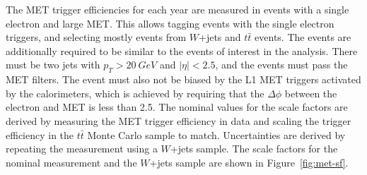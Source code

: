 The MET trigger efficiencies for each year are measured in events with a single electron and large MET.
This allows tagging events with the single electron triggers, and selecting mostly
events from $W$+jets and $t\bar{t}$ events.
The events are additionally required to be similar to the events of interest in the analysis.
There must be two jets with $p_T > \SI{20}{GeV}$ and $|\eta| < 2.5$,
and the events must pass the MET filters.
The event must also not be biased by the L1 MET triggers activated by the calorimeters,
which is achieved by requiring that the $\Delta\phi$ between the electron and MET is
less than 2.5. 
The nominal values for the scale factors are derived by measuring
the MET trigger efficiency in data and scaling the trigger efficiency in
the $t\bar{t}$ Monte Carlo sample to match.
Uncertainties are derived by repeating the measurement using a $W$+jets sample.
The scale factors for the nominal measurement and the $W$+jets sample are shown in
Figure~\ref{fig:met-sf}.
